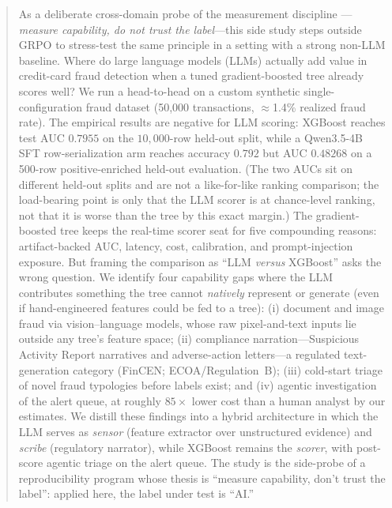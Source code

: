 \begin{abstract}
As a deliberate cross-domain probe of the \ours{} measurement discipline
---\emph{measure capability, do not trust the label}---this side study steps
outside GRPO to stress-test the same principle in a setting with a strong
non-LLM baseline. Where do large language models (LLMs) actually add value in
credit-card fraud detection when a tuned gradient-boosted tree already scores well? We run a
head-to-head on a custom synthetic single-configuration fraud dataset (50{,}000
transactions, $\approx$1.4\% realized fraud rate). The empirical results are negative for LLM scoring:
XGBoost reaches test AUC $0.7955$ on the $10{,}000$-row held-out split, while
a Qwen3.5-4B SFT row-serialization arm reaches accuracy $0.792$ but AUC
$0.48268$ on a 500-row positive-enriched held-out evaluation. (The two AUCs sit on
different held-out splits and are not a like-for-like ranking comparison; the
load-bearing point is only that the LLM scorer is at chance-level ranking, not that
it is worse than the tree by this exact margin.) The gradient-boosted tree keeps the real-time scorer seat for five compounding reasons:
artifact-backed AUC, latency, cost, calibration, and prompt-injection exposure.
But framing the comparison as
``LLM \emph{versus} XGBoost'' asks the wrong question. We identify four
capability gaps where the LLM contributes something the tree cannot \emph{natively}
represent or generate (even if hand-engineered features could be fed to a tree):
(i) document and image fraud via vision--language models, whose
raw pixel-and-text inputs lie outside any tree's feature space; (ii) compliance
narration---Suspicious Activity Report narratives and adverse-action
letters---a regulated text-generation category (FinCEN; ECOA/Regulation~B);
(iii) cold-start triage of novel fraud typologies before labels exist; and
(iv) agentic investigation of the alert queue, at roughly $85\times$ lower cost
than a human analyst by our estimates. We distill these findings into a
hybrid architecture in which the LLM serves as \emph{sensor} (feature extractor
over unstructured evidence) and \emph{scribe} (regulatory narrator), while
XGBoost remains the \emph{scorer}, with post-score agentic triage on the alert
queue. The study is the side-probe of a reproducibility program whose thesis is
``measure capability, don't trust the label'': applied here, the label under
test is ``AI.''
\end{abstract}
